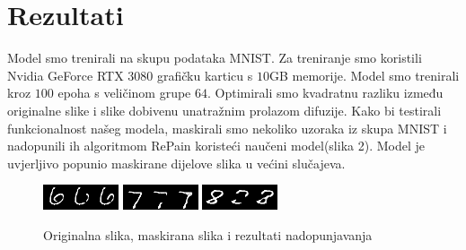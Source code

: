 \documentclass[10pt, a4paper, croatian]{article}
\begin{document}
\section{Rezultati}
Model smo trenirali na skupu podataka MNIST. Za treniranje smo koristili Nvidia GeForce RTX 3080 grafičku karticu s $10$GB memorije.
Model smo trenirali kroz $100$ epoha s veličinom grupe $64$. Optimirali smo kvadratnu razliku između originalne slike i slike dobivenu unatražnim prolazom difuzije.
Kako bi testirali funkcionalnost našeg modela, maskirali smo nekoliko uzoraka iz skupa MNIST i nadopunili ih algoritmom RePain koristeći naučeni model(slika 2).
Model je uvjerljivo popunio maskirane dijelove slika u većini slučajeva.
\begin{figure}
	\begin{center}
	\includegraphics[width=\columnwidth]{../repaint_output/inpainted_combined_6.png}
	\includegraphics[width=\columnwidth]{../repaint_output/inpainted_combined_7.png}
	\includegraphics[width=\columnwidth]{../repaint_output/inpainted_combined_8.png}
	\caption{Originalna slika, maskirana slika i rezultati nadopunjavanja}
	\label{fig:figure3}
	\end{center}
\end{figure}
\end{document}
